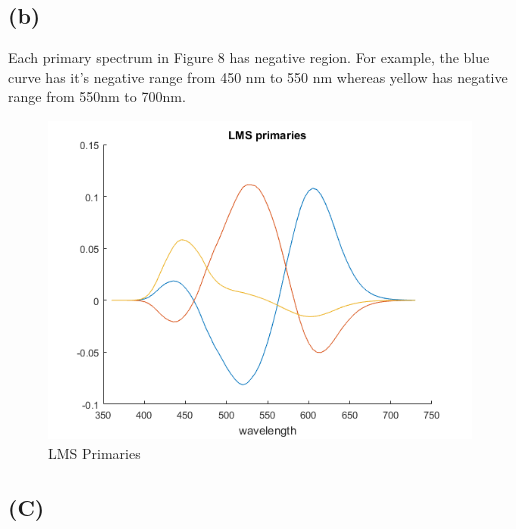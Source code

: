 \documentclass[12pt,letterpaper]{article}
\begin{document}
\subsection*{(b)}
Each primary spectrum in Figure 8 has negative region. For example, the blue curve has it's negative range from 450 nm to 550 nm whereas yellow has negative range from 550nm to 700nm. 
\begin{figure}[htbp]
	\includegraphics{lmsprimaries.png}
	\caption{LMS Primaries}
\end{figure}
\subsection*{(C)}
\end{document}
